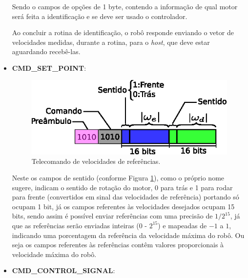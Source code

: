 \begin{itemize}
        
        Sendo o campos de opções de 1 byte, contendo a informação de qual motor será feita a identificação e se deve ser usado o controlador.
        
        Ao concluir a rotina de identificação, o robô responde enviando o vetor de velocidades medidas, durante a rotina, para o \textit{host}, que deve estar aguardando recebê-las.
        
        
    \item \textbf{CMD\_SET\_POINT}:\\
        
        \begin{figure}[H]
            \centering
            \includegraphics[width=\textwidth]{figuras/ilustracoes/ilustracao_comando_omega_ref.eps}
            \caption{Telecomando de velocidades de referências.}
            \label{fig:comando_referencia}
        \end{figure}
        
        
        Neste os campos de sentido (conforme Figura \ref{fig:comando_referencia}), como o próprio nome sugere, indicam o sentido de rotação do motor, 0 para trás e 1 para rodar para frente (convertidos em sinal das velocidades de referência) portando só ocupam 1 bit, já os campos referentes às velocidades desejados ocupam 15 bits, sendo assim é possível enviar referências com uma precisão de $1/2^{15}$, já que as referências serão enviadas inteiras  (0 - $2^{15}$) e mapeadas de $-1$ a $1$, indicando uma porcentagem da referência da velocidade máxima do robô. Ou seja os campos referentes às referências contêm valores proporcionais à velocidade máxima do robô.
        
    \item \textbf{CMD\_CONTROL\_SIGNAL}:\\
        

\end{itemize}
